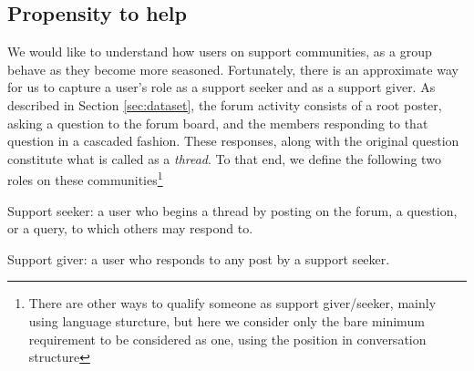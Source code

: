 \subsection{Propensity to help} 
We would like to understand how users on support communities, as a group behave as they become more seasoned. Fortunately, there is an approximate way for us to capture a user's role as a support seeker and as a support giver. As described in Section \ref{sec:dataset}, the forum activity consists of a root poster, asking a question to the forum board, and the members responding to that question in a cascaded fashion. These responses, along with the original question constitute what is called as a \textsl{thread}.
To that end, we define the following two roles on these communities\footnote{There are other ways to qualify someone as support giver/seeker, mainly using language sturcture, but here we consider only the bare minimum requirement to be considered as one, using the position in conversation structure}
\begin{definition}
    Support seeker: a user who begins a thread by posting on the forum, a question, or a query, to which others may respond to.
\end{definition}

\begin{definition}
    Support giver: a user who responds to any post by a support seeker.
\end{definition}

